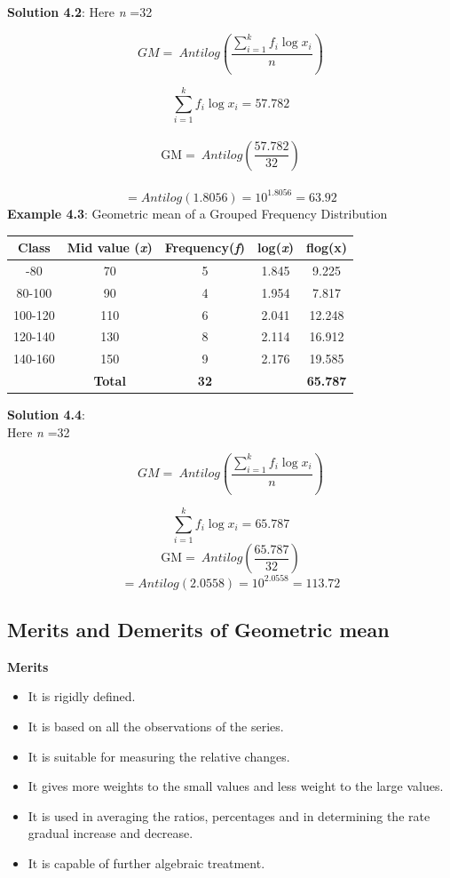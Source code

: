 \documentclass[
]{book}
\begin{document}
\textbf{Solution 4.2}: Here \emph{n} =32

\[GM = \ Antilog\left( \frac{\sum_{i = 1}^{k}{{f_{i}\log}x_{i}}}{n} \right)\]

\[{\sum_{i = 1}^{k}{{f_{i}\log}x_{i}} = 57.782
}\]\\
\[{\text{GM} = \ Antilog\left( \frac{57.782}{32} \right)  }\]\\
\[{= Antilog\left( 1.8056 \right)= 10^{1.8056} = 63.92}\] \textbf{Example
4.3}: Geometric mean of a Grouped Frequency Distribution

\begin{longtable}[]{@{}ccccc@{}}
\toprule\noalign{}
Class & Mid value (\emph{x}) & Frequency(\emph{f}) & log(\emph{x}) & flog(x) \\
\midrule\noalign{}
\endhead
\bottomrule\noalign{}
\endlastfoot
60-80 & 70 & 5 & 1.845 & 9.225 \\
80-100 & 90 & 4 & 1.954 & 7.817 \\
100-120 & 110 & 6 & 2.041 & 12.248 \\
120-140 & 130 & 8 & 2.114 & 16.912 \\
140-160 & 150 & 9 & 2.176 & 19.585 \\
& \textbf{Total} & \textbf{32} & & \textbf{65.787} \\
\end{longtable}

\textbf{Solution 4.4}:\\
Here \emph{n} =32

\[GM = \ Antilog\left( \frac{\sum_{i = 1}^{k}{{f_{i}\log}x_{i}}}{n} \right)\]

\[{\sum_{i = 1}^{k}{{f_{i}\log}x_{i}} = 65.787}\]
\[{\text{GM} = \ Antilog\left( \frac{65.787}{32} \right)}\]
\[{= Antilog\left( 2.0558 \right) = 10^{2.0558} = 113.72}\]

\hypertarget{merits-and-demerits-of-geometric-mean}{%
\subsection{Merits and Demerits of Geometric mean}\label{merits-and-demerits-of-geometric-mean}}

{\textbf{Merits}}

\begin{itemize}
\item
  It is rigidly defined.
\item
  It is based on all the observations of the series.
\item
  It is suitable for measuring the relative changes.
\item
  It gives more weights to the small values and less weight to the
  large values.
\item
  It is used in averaging the ratios, percentages and in determining
  the rate gradual increase and decrease.
\item
  It is capable of further algebraic treatment.
\end{itemize}
\end{document}

